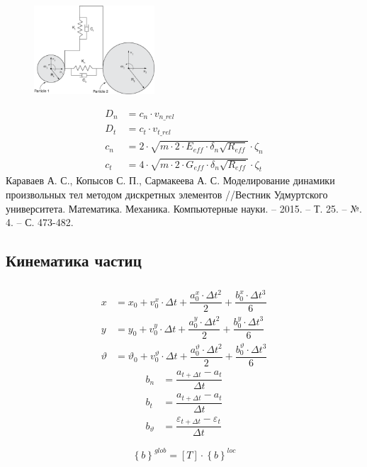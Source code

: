 \documentclass[c]{beamer}  %
\begin{document}
\begin{frame}
\frametitle{\insertsection} 
\framesubtitle{\insertsubsection}
\begin{figure}
	\centering
	\includegraphics[width=0.4\textwidth]{dempfer}
\end{figure} 
\begin{align*}
D_n &= c_n \cdot v_{n\_rel}\\
D_t &= c_t \cdot v_{t\_rel}\\
c_n &= 2 \cdot \sqrt{m \cdot 2 \cdot E_{eff} \cdot \delta_n \sqrt{R_{eff}}} \cdot \zeta_n \\
c_t &= 4 \cdot \sqrt{m \cdot 2 \cdot G_{eff} \cdot \delta_n \sqrt{R_{eff}}} \cdot \zeta_t
\end{align*}
Караваев А. С., Копысов С. П., Сармакеева А. С. Моделирование динамики произвольных тел методом дискретных элементов //Вестник Удмуртского университета. Математика. Механика. Компьютерные науки. – 2015. – Т. 25. – №. 4. – С. 473-482.
\end{frame}














\subsection{Кинематика частиц}

\begin{frame}
\frametitle{\insertsection} 
\framesubtitle{\insertsubsection}
\begin{align}
x &= x_0 + v^x_0 \cdot \Delta t + \dfrac{a^x_0 \cdot \Delta t^2}{2} + \dfrac{b^x_0 \cdot \Delta t^3}{6}\\
y &= y_0 + v^y_0 \cdot \Delta t + \dfrac{a^y_0 \cdot \Delta t^2}{2} + \dfrac{b^y_0 \cdot \Delta t^3}{6}\\
\vartheta &= \vartheta_0 + v^{\vartheta}_0 \cdot \Delta t + \dfrac{a^{\vartheta}_0 \cdot \Delta t^2}{2} + \dfrac{b^{\vartheta}_0 \cdot \Delta t^3}{6}
\end{align}
\begin{align}
b_n &= \dfrac{a_{t + \Delta t} - a_{t}}{\Delta t} \\
b_t &= \dfrac{a_{t + \Delta t} - a_{t}}{\Delta t} \\
b_{\vartheta} &= \dfrac{\varepsilon_{t + \Delta t} - \varepsilon_{t}}{\Delta t} 
\end{align}

\[
\left\lbrace b \right\rbrace^{glob} = [T] \cdot \left\lbrace b \right\rbrace^{loc}
\]
\end{frame}
\end{document}
